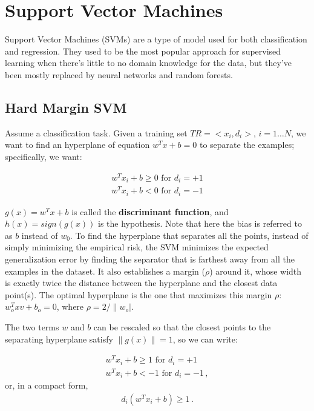 \chapter{Support Vector Machines}

Support Vector Machines (SVMs) are a type of model used for both classification and regression. They used to be the most popular approach for supervised learning when there's little to no domain knowledge for the data, but they've been mostly replaced by neural networks and random forests.

\section{Hard Margin SVM}

Assume a classification task. Given a training set $TR = <x_i,d_i>, \, i=1 \dots N$, we want to find an hyperplane of equation $w^T x + b = 0$ to separate the examples; specifically, we want:

\begin{gather*}
    w^T x_i + b \geq 0 \text{ for } d_i = +1 \\
    w^T x_i + b < 0 \text{ for } d_i = -1
\end{gather*}

$g(x) = w^T x + b$ is called the \textbf{discriminant function}, and $h(x) = sign(g(x))$ is the hypothesis. Note that here the bias is referred to as $b$ instead of $w_0$. To find the hyperplane that separates all the points, instead of simply minimizing the empirical risk, the SVM minimizes the expected generalization error by finding the separator that is farthest away from all the examples in the dataset. It also establishes a margin ($\rho$) around it, whose width is exactly twice the distance between the hyperplane and the closest data point(s). The optimal hyperplane is the one that maximizes this margin $\rho$: $w_o^Txv + b_o = 0$, where $\rho = 2 / \|w_o|$.

The two terms $w$ and $b$ can be rescaled so that the closest points to the separating hyperplane satisfy $\|g(x)\| = 1$, so we can write:

\begin{gather*}
    w^T x_i + b \geq 1 \text{ for } d_i = +1 \\
    w^T x_i + b < -1 \text{ for } d_i = -1 \, ,
\end{gather*}
or, in a compact form,
\begin{gather*}
    d_i(w^T x_i + b) \geq 1 \, .
\end{gather*}

